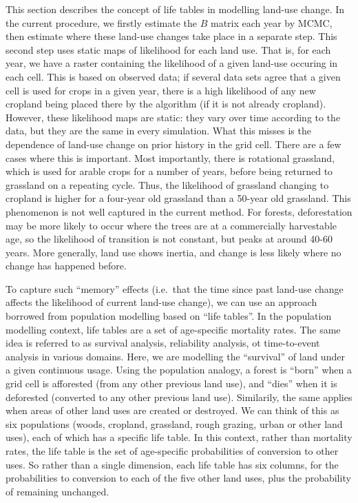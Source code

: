 \documentclass[
]{book}
\begin{document}
This section describes the concept of life tables in modelling land-use change. In the current procedure, we firstly estimate the \(B\) matrix each year by MCMC, then estimate where these land-use changes take place in a separate step. This second step uses static maps of likelihood for each land use. That is, for each year, we have a raster containing the likelihood of a given land-use occuring in each cell. This is based on observed data; if several data sets agree that a given cell is used for crops in a given year, there is a high likelihood of any new cropland being placed there by the algorithm (if it is not already cropland). However, these likelihood maps are static: they vary over time according to the data, but they are the same in every simulation. What this misses is the dependence of land-use change on prior history in the grid cell. There are a few cases where this is important. Most importantly, there is rotational grassland, which is used for arable crops for a number of years, before being returned to grassland on a repeating cycle. Thus, the likelihood of grassland changing to cropland is higher for a four-year old grassland than a 50-year old grassland. This phenomenon is not well captured in the current method. For forests, deforestation may be more likely to occur where the trees are at a commercially harvestable age, so the likelihood of transition is not constant, but peaks at around 40-60 years. More generally, land use shows inertia, and change is less likely where no change has happened before.

To capture such ``memory'' effects (i.e.~that the time since past land-use change affects the likelihood of current land-use change), we can use an approach borrowed from population modelling based on ``life tables''. In the population modelling context, life tables are a set of age-specific mortality rates. The same idea is referred to as survival analysis, reliability analysis, ot time-to-event analysis in various domains. Here, we are modelling the ``survival'' of land under a given continuous usage. Using the population analogy, a forest is ``born'' when a grid cell is afforested (from any other previous land use), and ``dies'' when it is deforested (converted to any other previous land use). Similarily, the same applies when areas of other land uses are created or destroyed.
We can think of this as six populations (woods, cropland, grassland, rough grazing, urban or other land uses), each of which has a specific life table. In this context, rather than mortality rates, the life table is the set of age-specific probabilities of conversion to other uses. So rather than a single dimension, each life table has six columns, for the probabilities to conversion to each of the five other land uses, plus the probability of remaining unchanged.
\end{document}

